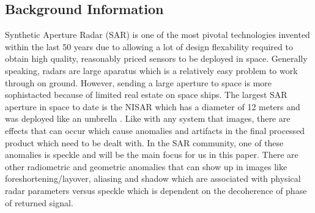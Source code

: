\documentclass[conference]{IEEEtran}
\begin{document}
\subsection{Background Information}
\par Synthetic Aperture Radar (SAR) is one of the most pivotal technologies invented within the last 50 years due to allowing a lot of design flexability required to obtain high quality, reasonably priced sensors to be deployed in space\cite{sarHist}. Generally speaking, radars are large aparatus which is a relatively easy problem to work through on ground. However, sending a large aperture to space is more sophistacted because of limited real estate on space ships. The largest SAR aperture in space to date is the NISAR which has a diameter of 12 meters and was deployed like an umbrella \cite{nisar}. Like with any system that images, there are effects that can occur which cause anomalies and artifacts in the final processed product which need to be dealt with. In the SAR community, one of these anomalies is speckle and will be the main focus for us in this paper. There are other radiometric and geometric anomalies that can show up in images like foreshortening/layover, aliasing and shadow\cite{sarIntro} which are associated with physical radar parameters versus speckle which is dependent on the decoherence of phase of returned signal. 
\end{document}
